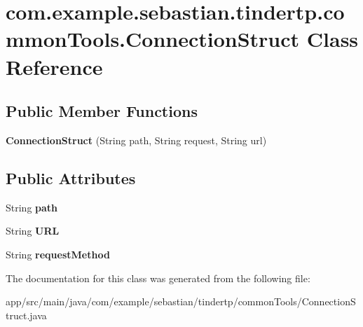 \hypertarget{classcom_1_1example_1_1sebastian_1_1tindertp_1_1commonTools_1_1ConnectionStruct}{}\section{com.\+example.\+sebastian.\+tindertp.\+common\+Tools.\+Connection\+Struct Class Reference}
\label{classcom_1_1example_1_1sebastian_1_1tindertp_1_1commonTools_1_1ConnectionStruct}
\subsection*{Public Member Functions}
\begin{DoxyCompactItemize}
\item 
{\bfseries Connection\+Struct} (String path, String request, String url)\hypertarget{classcom_1_1example_1_1sebastian_1_1tindertp_1_1commonTools_1_1ConnectionStruct_a0765bbda7b7b862a9ec524bc32c85082}{}\label{classcom_1_1example_1_1sebastian_1_1tindertp_1_1commonTools_1_1ConnectionStruct_a0765bbda7b7b862a9ec524bc32c85082}

\end{DoxyCompactItemize}
\subsection*{Public Attributes}
\begin{DoxyCompactItemize}
\item 
String {\bfseries path}\hypertarget{classcom_1_1example_1_1sebastian_1_1tindertp_1_1commonTools_1_1ConnectionStruct_a679da8b9928f195d2120917108a2cf3d}{}\label{classcom_1_1example_1_1sebastian_1_1tindertp_1_1commonTools_1_1ConnectionStruct_a679da8b9928f195d2120917108a2cf3d}

\item 
String {\bfseries U\+RL}\hypertarget{classcom_1_1example_1_1sebastian_1_1tindertp_1_1commonTools_1_1ConnectionStruct_ae820f71dffd1545b59af78fa6c7c97d2}{}\label{classcom_1_1example_1_1sebastian_1_1tindertp_1_1commonTools_1_1ConnectionStruct_ae820f71dffd1545b59af78fa6c7c97d2}

\item 
String {\bfseries request\+Method}\hypertarget{classcom_1_1example_1_1sebastian_1_1tindertp_1_1commonTools_1_1ConnectionStruct_a5a0cb9834858da782fcd978d497b9248}{}\label{classcom_1_1example_1_1sebastian_1_1tindertp_1_1commonTools_1_1ConnectionStruct_a5a0cb9834858da782fcd978d497b9248}

\end{DoxyCompactItemize}


The documentation for this class was generated from the following file\+:\begin{DoxyCompactItemize}
\item 
app/src/main/java/com/example/sebastian/tindertp/common\+Tools/Connection\+Struct.\+java\end{DoxyCompactItemize}
